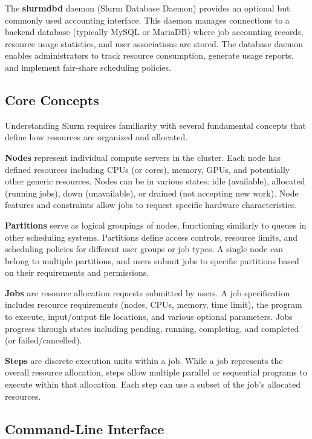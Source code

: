 The \textbf{slurmdbd} daemon (Slurm Database Daemon) provides an optional but commonly used accounting interface. This daemon manages connections to a backend database (typically MySQL or MariaDB) where job accounting records, resource usage statistics, and user associations are stored. The database daemon enables administrators to track resource consumption, generate usage reports, and implement fair-share scheduling policies.

\subsection{Core Concepts}

Understanding Slurm requires familiarity with several fundamental concepts that define how resources are organized and allocated.

\textbf{Nodes} represent individual compute servers in the cluster. Each node has defined resources including CPUs (or cores), memory, GPUs, and potentially other generic resources. Nodes can be in various states: idle (available), allocated (running jobs), down (unavailable), or drained (not accepting new work). Node features and constraints allow jobs to request specific hardware characteristics.

\textbf{Partitions} serve as logical groupings of nodes, functioning similarly to queues in other scheduling systems. Partitions define access controls, resource limits, and scheduling policies for different user groups or job types. A single node can belong to multiple partitions, and users submit jobs to specific partitions based on their requirements and permissions.

\textbf{Jobs} are resource allocation requests submitted by users. A job specification includes resource requirements (nodes, CPUs, memory, time limit), the program to execute, input/output file locations, and various optional parameters. Jobs progress through states including pending, running, completing, and completed (or failed/cancelled).

\textbf{Steps} are discrete execution units within a job. While a job represents the overall resource allocation, steps allow multiple parallel or sequential programs to execute within that allocation. Each step can use a subset of the job's allocated resources.

\subsection{Command-Line Interface}

